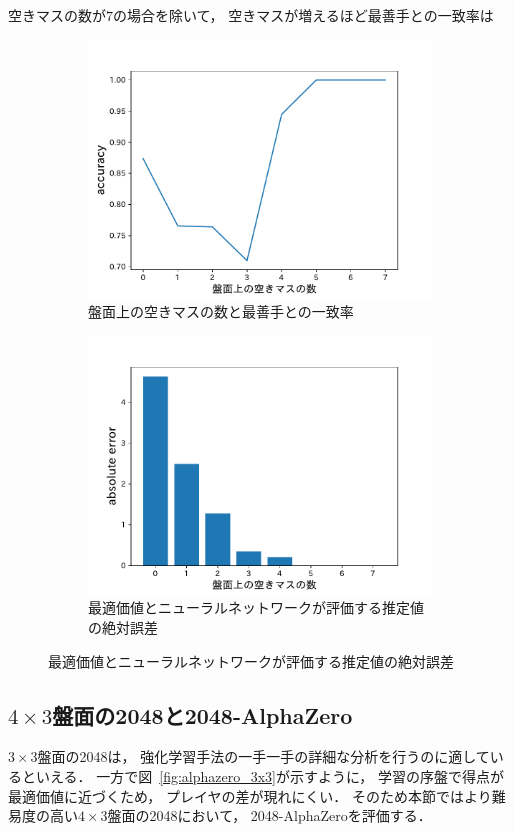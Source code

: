 空きマスの数が$7$の場合を除いて， 空きマスが増えるほど最善手との一致率は
\begin{figure}
    \begin{subfigure}[T]{0.5\columnwidth}
        \centering
        \includegraphics[width=\columnwidth]{figures/empty_tiles_accuracy.pdf}
        \caption{盤面上の空きマスの数と最善手との一致率}
        \label{fig:empty_tiles_accuracy}
    \end{subfigure}
    \begin{subfigure}[T]{0.5\columnwidth}
        \centering
        \includegraphics[width=\columnwidth]{figures/empty_tiles_abs_error.pdf}
        \caption{最適価値とニューラルネットワークが評価する推定値の絶対誤差}
        \label{fig:empty_tiles_abs_error}
    \end{subfigure}
\end{figure}

\subsection{$4\times3$盤面の2048と2048-AlphaZero}
$3\times3$盤面の2048は， 強化学習手法の一手一手の詳細な分析を行うのに適しているといえる．
一方で図~\ref{fig:alphazero_3x3}が示すように， 学習の序盤で得点が最適価値に近づくため， プレイヤの差が現れにくい．
そのため本節ではより難易度の高い$4\times3$盤面の2048において， 2048-AlphaZeroを評価する．